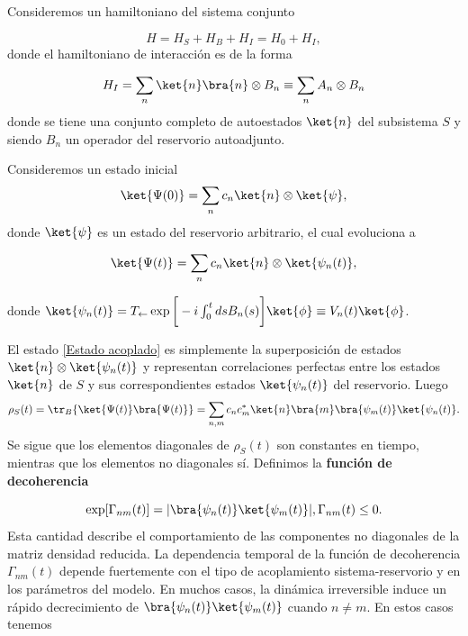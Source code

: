 Consideremos un hamiltoniano del sistema conjunto 

\begin{equation}
    H = H_S + H_B + H_I = H_0 + H_I,
\end{equation}
donde el hamiltoniano de interacción es de la forma

\begin{equation}
    H_I = \sum_{n} \ket{n}\bra{n} \otimes B_n \equiv \sum_{n} A_n \otimes B_n
\end{equation}
donde se tiene una conjunto completo de autoestados $\ket{n}$ del subsistema $S$ y siendo $B_n$ un operador del reservorio autoadjunto.  

Consideremos un estado inicial \begin{equation}
    \ket{\Psi (0)} = \sum_{n} c_{n} \ket{n} \otimes \ket{\psi},
\end{equation}
donde $\ket{\psi}$ es un estado del reservorio arbitrario, el cual evoluciona a 

\begin{equation}
    \ket{\Psi(t)}=\sum_{n} c_{n} \ket{n} \otimes \ket{\psi_n(t)},
    \label{Estado acoplado}
\end{equation}

donde $\ket{\psi_n(t)} = T_{\leftarrow} \exp \bigg[-i\int_{0}^{t} ds B_n(s)\bigg] \ket{\phi} \equiv V_n(t) \ket{\phi}$.  

El estado \eqref{Estado acoplado} es simplemente la superposición de estados $\ket{n} \otimes \ket{\psi_n(t)}$ y representan correlaciones perfectas entre los estados $\ket{n}$ de $S$ y sus correspondientes estados $\ket{\psi_n(t)}$ del reservorio. Luego
\begin{equation}
    \rho_S(t) = \tr_{B}\{\ket{\Psi(t)}\bra{\Psi(t)}\} = \sum_{n,m} c_n c_m^{*} \ket{n}\bra{m}\bra{\psi_m(t)}\ket{{\psi_n(t)}}.
    \label{Decoherencia inicial}
\end{equation}
Se sigue que los elementos diagonales de $\rho_S (t)$ son constantes en tiempo, mientras que los elementos no diagonales sí. Definimos la \textbf{función de decoherencia} 

\begin{equation}
    \exp[\Gamma_{nm}(t)] = |\bra{\psi_n(t)}\ket{{\psi_m(t)}}|, \Gamma_{nm}(t) \leq 0.
\end{equation}
Esta cantidad describe el comportamiento de las componentes no diagonales de la matriz densidad reducida. La dependencia temporal de la función de decoherencia $\Gamma_{nm}(t)$ depende fuertemente con el tipo de acoplamiento sistema-reservorio y en los parámetros del modelo. En muchos casos, la dinámica irreversible induce un rápido decrecimiento de $\bra{\psi_n(t)}\ket{{\psi_m(t)}}$ cuando $n \neq m$. En estos casos tenemos

